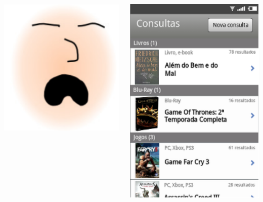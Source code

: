 \documentclass[14pt,beamer]{beamer}
\begin{document}
\begin{frame}
        \begin{columns}
           \begin{column}{.4\textwidth}
                \hfill
                \includegraphics[scale=.3]{imagens/LixoSono}
                \vfill
            \end{column} 
            \begin{column}{.6\textwidth}
                \includegraphics[scale=.5]{tela/TelaHistorico}
            \end{column}
        \end{columns}
\end{frame}
\end{document}

